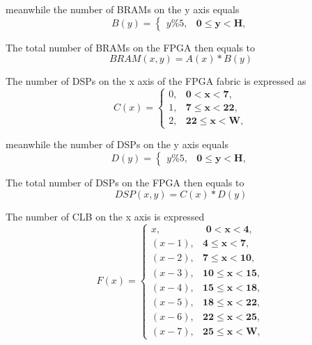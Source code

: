 \documentclass[11pt]{article}
\theoremstyle{definition}
\begin{document}
meanwhile the number of BRAMs on the y axis equals 
\begin{equation}
B(y) = \begin{cases} 
y\%5, & \textbf{0$\leq$y$<$H},
\end{cases}
\end{equation}

The total number of BRAMs on the FPGA then equals to \\
\begin{equation}
BRAM(x,y) =  A(x) * B(y)
\end{equation}

The number of DSPs on the x axis of the FPGA fabric is expressed as 
\begin{equation}
C(x) = \begin{cases}
0, & \textbf{0$<$x$<$7}, \\
1, & \textbf{7$\leq$x$<$22}, \\
2, & \textbf{22$\leq$x$<$W},
\end{cases}
\end{equation}

meanwhile the number of DSPs on the y axis equals 
\begin{equation}
D(y) = \begin{cases} 
y\%5, & \textbf{0$\leq$y$<$H},
\end{cases}
\end{equation}

The total number of DSPs on the FPGA then equals to \\
\begin{equation}
DSP(x,y) =  C(x) * D(y)
\end{equation}					  


The number of CLB on the x axis is expressed 					  
\begin{equation}
F(x) = \begin{cases}
x, & \textbf{ 0$<$x$<$4}, \\
(x-1), & \textbf{4$\leq$x$<$7}, \\
(x-2), & \textbf{7$\leq$x$<$10}, \\
(x-3), & \textbf{10$\leq$x$<$15}, \\
(x-4), & \textbf{15$\leq$x$<$18}, \\
(x-5), & \textbf{18$\leq$x$<$22}, \\
(x-6), & \textbf{22$\leq$x$<$25}, \\
(x-7), & \textbf{25$\leq$x$<$W},
\end{cases}
\end{equation}
\end{document}
